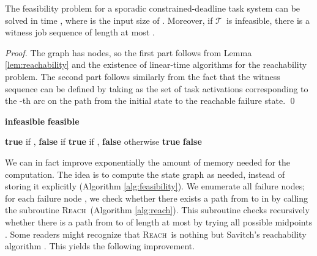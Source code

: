 \documentclass{llncs}
\newcommand{\tsys}{\ensuremath{\mathcal{T}}}
\begin{document}
\begin{theorem}
\label{thm:main}
The feasibility problem for a sporadic constrained-deadline task system  can be solved in time , where  is the input size of . Moreover, if \tsys\ is infeasible, there is a witness job sequence of length at most . 
\end{theorem}
\begin{proof}
The graph has  nodes, so the first part follows from Lemma \ref{lem:reachability} and the existence of linear-time algorithms for the reachability problem. The second part follows similarly from the fact that the witness sequence  can be defined by taking  as the set of task activations corresponding to the -th arc on the path from the initial state to the reachable failure state.  
\qed
\end{proof}


\newcommand{\reach}{\textsc{Reach}}

\begin{algorithm}[t]
\caption{Algorithm for the feasibility problem}
\label{alg:feasibility}
\begin{algorithmic}
\IF{\reach(, , )} \RETURN \textbf{infeasible} \ENDIF
\ENDFOR 
\RETURN \textbf{feasible}
\end{algorithmic}
\end{algorithm}
\begin{algorithm}[t]
\caption{\reach(, , )}
\label{alg:reach}
\begin{algorithmic}
\IF{} \RETURN \textbf{true} if , \textbf{false} if  \ENDIF
\IF{} \RETURN \textbf{true} if , \textbf{false} otherwise \ENDIF
\FORALL{}
\IF{\reach(, , ) \textbf{and} \reach(, , )}
	\RETURN\textbf{true}
\ENDIF
\ENDFOR
\RETURN\textbf{false}
\end{algorithmic}
\end{algorithm}



We can in fact improve exponentially the amount of memory needed for the computation. The idea is to compute the state graph as needed, instead of storing it explicitly (Algorithm \ref{alg:feasibility}). We enumerate all failure nodes; for each failure node , we check whether there exists a path from  to  in  by calling the subroutine \reach\ (Algorithm \ref{alg:reach}). This subroutine checks recursively whether there is a path from  to  of length at most  by trying all possible midpoints . Some readers might recognize that \reach\ is nothing but Savitch's reachability algorithm \cite{Savitch:1970}. This yields the following improvement. 
\end{document}

